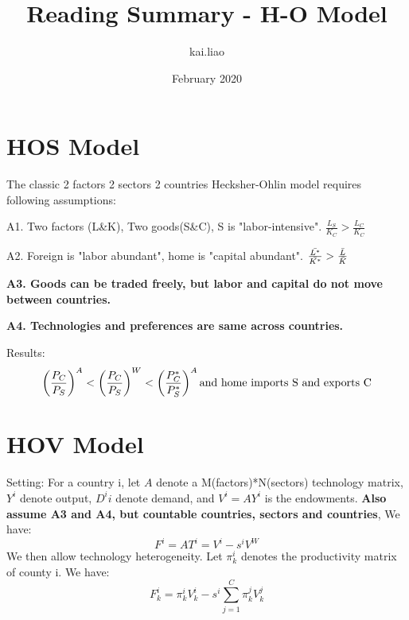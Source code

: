 \documentclass{article}
\title{Reading Summary - H-O Model}
\author{kai.liao }
\date{February 2020}
\begin{document}
\maketitle

\section{HOS Model}
The classic 2 factors 2 sectors 2 countries Hecksher-Ohlin model requires following assumptions: 

A1. Two factors (L\&K), Two goods(S\&C), S is "labor-intensive". $\frac{L_S}{K_C} > \frac{L_C}{K_C}$

A2. Foreign is "labor abundant", home is "capital abundant". $\frac{\Bar{L^*}}{\Bar{K^*}}>\frac{\Bar{L}}{\Bar{K}}$

\textbf{A3. Goods can be traded freely, but labor and capital do not move between countries.}

\textbf{A4. Technologies and preferences are same across countries.}

\noindent Results:
\begin{equation}
    \left(\frac{P_C}{P_S}\right)^A<\left(\frac{P_C}{P_S}\right)^W<\left(\frac{P_C^*}{P_S^*}\right)^A \\
    \text{and home imports S and exports C}
\end{equation}


\section{HOV Model}

Setting: For a country i, let $A$ denote a M(factors)*N(sectors) technology matrix, $Y^i$ denote output, $D^ii$ denote demand, and $V^i = AY^i$ is the endowments. \textbf{Also assume A3 and A4, but countable countries, sectors and countries}, We have:
\begin{equation}
    F^i = AT^i = V^i-s^iV^W
\end{equation}
We then allow technology heterogeneity. Let $\pi_{k}^i$ denotes the productivity matrix of county i. We have:
\begin{equation}
    F_k^i = \pi_k^i V_k^i- s^i \sum_{j=1}^C \pi_k^j V_k^j
\end{equation}
\end{document}

